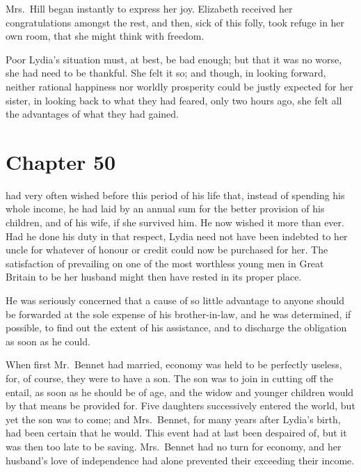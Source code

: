 Mrs.\ Hill began instantly to express her joy.  Elizabeth received
her congratulations amongst the rest, and then, sick of this folly,
took refuge in her own room, that she might think with freedom.

Poor Lydia's situation must, at best, be bad enough; but that
it was no worse, she had need to be thankful.  She felt it so;
and though, in looking forward, neither rational happiness nor
worldly prosperity could be justly expected for her sister, in
looking back to what they had feared, only two hours ago, she
felt all the advantages of what they had gained.



\chapter{Chapter 50}


 had very often wished before this period of his life
that, instead of spending his whole income, he had laid by an
annual sum for the better provision of his children, and of his
wife, if she survived him.  He now wished it more than ever.
Had he done his duty in that respect, Lydia need not have been
indebted to her uncle for whatever of honour or credit could
now be purchased for her.  The satisfaction of prevailing on
one of the most worthless young men in Great Britain to be her
husband might then have rested in its proper place.

He was seriously concerned that a cause of so little advantage
to anyone should be forwarded at the sole expense of his
brother-in-law, and he was determined, if possible, to find out
the extent of his assistance, and to discharge the obligation
as soon as he could.

When first Mr.\ Bennet had married, economy was held to be
perfectly useless, for, of course, they were to have a son.  The
son was to join in cutting off the entail, as soon as he should
be of age, and the widow and younger children would by that
means be provided for.  Five daughters successively entered the
world, but yet the son was to come; and Mrs.\ Bennet, for many
years after Lydia's birth, had been certain that he would.  This
event had at last been despaired of, but it was then too late to
be saving.  Mrs.\ Bennet had no turn for economy, and her
husband's love of independence had alone prevented their
exceeding their income.

